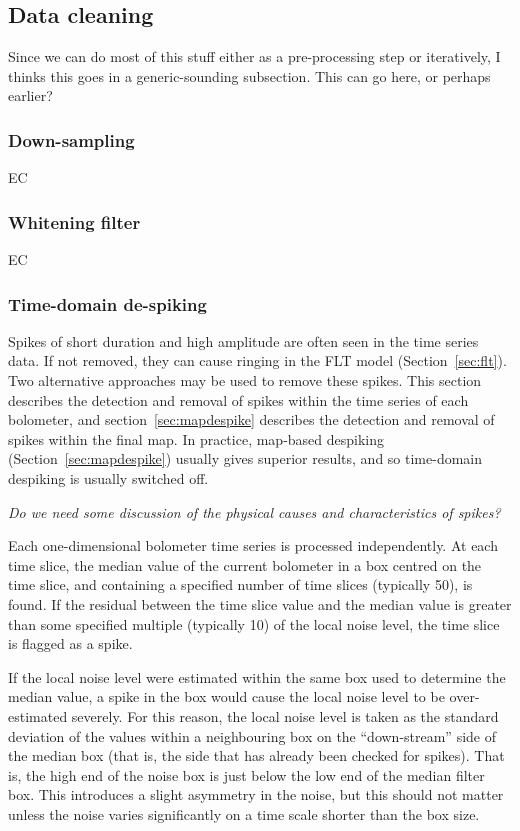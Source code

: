 \documentclass[useAMS,usenatbib,nofootinbib]{mn2e}
\begin{document}
\subsection{Data cleaning}

Since we can do most of this stuff either as a pre-processing step or
iteratively, I thinks this goes in a generic-sounding subsection. This
can go here, or perhaps earlier?

\subsubsection{Down-sampling}

EC

\subsubsection{Whitening filter}

EC

\subsubsection{Time-domain de-spiking}
\label{sec:timedespike}

Spikes of short duration and high amplitude are often seen in the time
series data. If not removed, they can cause ringing in the FLT model
(Section~\ref{sec:flt}). Two alternative approaches may be used to remove
these spikes. This section describes the detection and removal of spikes
within the time series of each bolometer, and
section~\ref{sec:mapdespike} describes the detection and removal of
spikes within the final map. In practice, map-based despiking
(Section~\ref{sec:mapdespike}) usually gives superior results, and so
time-domain despiking is usually switched off.

\emph{Do we need some discussion of the physical causes and
characteristics of spikes?}

Each one-dimensional bolometer time series is processed independently. At
each time slice, the median value of the current bolometer in a box
centred on the time slice, and containing a specified number of time
slices (typically 50), is found. If the residual between the
time slice value and the median value is greater than some specified
multiple (typically 10) of the local noise level, the time slice is
flagged as a spike.

If the local noise level were estimated within the same box used to
determine the median value, a spike in the box would cause the local
noise level to be over-estimated severely. For this reason, the local
noise level is taken as the standard deviation of the values within a
neighbouring box on the ``down-stream'' side of the median box (that is,
the side that has already been checked for spikes). That is, the high end
of the noise box is just below the low end of the median filter box. This
introduces a slight asymmetry in the noise, but this should not matter
unless the noise varies significantly on a time scale shorter than the
box size.
\end{document}
